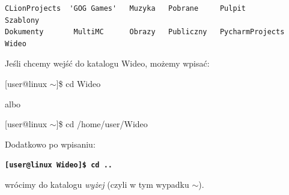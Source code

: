 \documentclass[12pt]{article}
\makeatletter
\newcommand{\ttbf}[1]{
    \texttt{\textbf{#1}}
}
\newenvironment{console1}
{
    \ttfamily
    \fontseries{b}
    \selectfont
    {[}user@linux $\sim${]}\$} {

    }
\makeatother
\begin{document}
\begin{verbatim}
CLionProjects  'GOG Games'   Muzyka   Pobrane     Pulpit            Szablony
Dokumenty       MultiMC      Obrazy   Publiczny   PycharmProjects   Wideo
\end{verbatim}

Jeśli chcemy wejść do katalogu Wideo, możemy wpisać:

\begin{console1}
    cd Wideo
\end{console1}

albo

\begin{console1}
    cd /home/user/Wideo
\end{console1}

Dodatkowo po wpisaniu:

\ttbf{[user@linux Wideo]\$ cd ..}

wrócimy do katalogu \emph{wyżej} (czyli w tym wypadku $\sim$).
\end{document}
